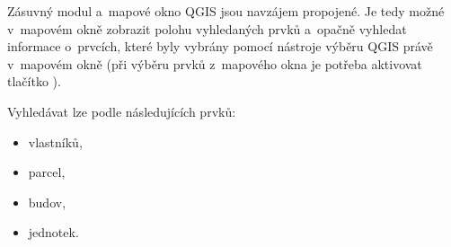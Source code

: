 \documentclass[a4paper,12pt,oneside]{book}
\begin{document}
Zásuvný modul a~mapové okno QGIS jsou navzájem propojené. Je tedy
možné v~mapovém okně zobrazit polohu vyhledaných prvků a~opačně
vyhledat informace o~prvcích, které byly vybrány pomocí nástroje
výběru QGIS právě v~mapovém okně (při výběru prvků z~mapového okna je
potřeba aktivovat tlačítko ).

Vyhledávat lze podle následujících prvků:

\begin{itemize}
 \item vlastníků,
 \item parcel,
 \item budov,
 \item jednotek.
\end{itemize}
\end{document}
